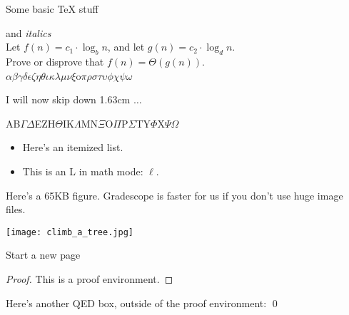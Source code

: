 \documentclass[12pt]{article}
\begin{document}
  



\pagestyle{plain}


\begin{center} Some basic TeX stuff 
\end{center}

 and  {\em italics}\\






\noindent Let $f(n) = c_1\cdot \log_b n$, and let $g(n) = c_2\cdot \log_d n$.  \\
	Prove or disprove that $f(n) = \Theta(g(n))$.\\





$\alpha \beta \gamma \delta \epsilon \zeta \eta \theta \iota \kappa \lambda \mu \nu \xi$o$\pi \rho \sigma \tau \upsilon \phi \chi \psi \omega$


I will now skip down 1.63cm $\ldots$
\vskip1.63cm



\noindent AB$\Gamma\Delta$EZH$\Theta$IK$\Lambda$MN$\Xi$O$\Pi$P$\Sigma$TY$\Phi$X$\Psi\Omega$\\


 


\begin{itemize}
\item Here's an itemized list.
\item This is an L in math mode: $\ell$.
\end{itemize}


\noindent Here's a 65KB figure. Gradescope is faster for us if you don't use huge image files. \\
\begin{center}
\texttt{[image: climb\_a\_tree.jpg]}
\end{center}

Start a new page
\newpage



\begin{proof}
This is a proof environment.
\end{proof}
%
%
%
Here's another QED box, outside of the  proof environment:  \qed 

\vskip1in
\end{document}
